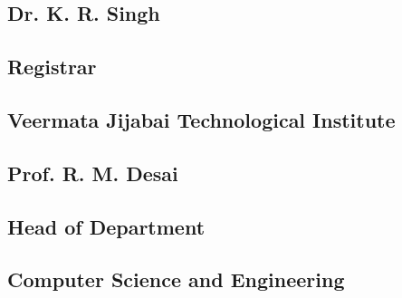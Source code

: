 \subsection*{Dr. K. R. Singh}

\subsection*{Registrar}

\subsection*{Veermata Jijabai Technological Institute}

\subsection*{Prof. R. M. Desai}

\subsection*{Head of Department}

\subsection*{Computer Science and Engineering}